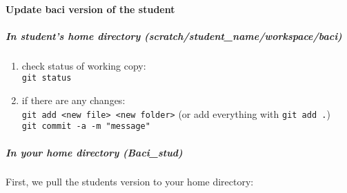 \paragraph{Update baci version of the student}
\subparagraph{In student's home directory (scratch/student\_name/workspace/baci)}
  \begin{enumerate}
   \item check status of working copy:\\
   \texttt{git status}
   \item if there are any changes:\\
   \texttt{git add <new file> <new folder>} (or add everything with \texttt{git add .})\\
   \texttt{git commit -a -m "message"}
  \end{enumerate}
\subparagraph{In your home directory (Baci\_stud)\\}
  First, we pull the students version to your home directory:
